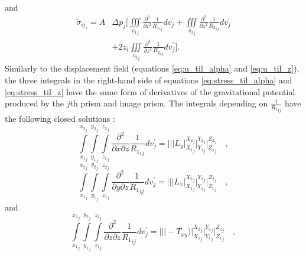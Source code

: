 \documentclass[P]{BrJG_submit}
\begin{document}
and 
\begin{equation}
\begin{aligned}
{\tilde{\sigma}}_{{ij}_{z}} \! = \! A  
& \Delta p_{j} \!  \Bigg[
\iiint\limits_{{v_{1}}_{j}} \! \! 
\frac{\partial^{2}}{\partial z^{2}} {\frac{1}{{R_1}_{ij}}}  dv_{j}^{\prime}
\! + \!\iiint\limits_{{v_{2}}_{j}}
\frac{\partial^{2} }{\partial z^{2}} {\frac{1}{{R_2}_{ij}}} dv_{j}^{\prime} \\
& + 2 z_{i}  \iiint\limits_{{v_{2}}_{j}}
\frac{\partial^{3}  }{\partial z^{3}} {\frac{1}{{R_2}_{ij}}}  
dv_{j}^{\prime} \Bigg].
\end{aligned}
\label{eq:stress_til_z}
\end{equation}
Similarly to the displacement field (equations \ref{eq:u_til_alpha} and \ref{eq:u_til_z}), the three integrals in the right-hand side of equations \ref{eq:stress_til_alpha} and \ref{eq:stress_til_z} have the same form of 
derivatives of the gravitational potential produced by the $j$th prism and image prism.
The integrals depending on $\frac{1}{{R_1}_{ij}}$ have the following closed 
solutions \citep{Nagyetal2000, Nagyetal2002}:
\begin{equation}
\int\limits_{{x_{1}}_{j}}^{{x_{2}}_{j}} \int\limits_{{y_{1}}_{j}}^{{y_{2}}_{j}} \int\limits_{{z_{1}}_{j}}^{{z_{2}}_{j}} 
\! \! \!
\frac{\partial^{2}  }{\partial x \partial z}{\frac{1}{{R_1}_{ij}}} dv_{j}^{\prime} = 
\Bigg|\Bigg|\Bigg| L_y 
\Bigg|_{{X_1}_{j}}^{{X_2}_{j}} \Bigg|_{{Y_1}_{j}}^{{Y_2}_{j}} \Bigg|_{{Z_1}_{j}}^{{Z_2}_{j}} \quad ,
\label{dxz1}
\end{equation}
\begin{equation}
\int\limits_{{x_{1}}_{j}}^{{x_{2}}_{j}} \int\limits_{{y_{1}}_{j}}^{{y_{2}}_{j}} \int\limits_{{z_{1}}_{j}}^{{z_{2}}_{j}}
\! \! \!
\frac{\partial^{2}  }{\partial y \partial z} {\frac{1}{{R_1}_{ij}}} dv_{j}^{\prime} =
\Bigg|\Bigg|\Bigg|
L_x
\Bigg|_{{X_1}_{j}}^{{X_2}_{j}} \Bigg|_{{Y_1}_{j}}^{{Y_2}_{j}} \Bigg|_{{Z_1}_{j}}^{{Z_2}_{j}} \quad ,
\label{dyz1}
\end{equation}
and
\begin{equation}
\int\limits_{{x_{1}}_{j}}^{{x_{2}}_{j}} \int\limits_{{y_{1}}_{j}}^{{y_{2}}_{j}} \int\limits_{{z_{1}}_{j}}^{{z_{2}}_{j}}
\! \! \!
\frac{\partial^{2}  }{\partial z \partial z} {\frac{1}{{R_1}_{ij}}} dv_{j}^{\prime} =
\Bigg|\Bigg|\Bigg|
-  T_{xy} \Bigg)
\Bigg|_{{X_1}_{j}}^{{X_2}_{j}} \Bigg|_{{Y_1}_{j}}^{{Y_2}_{j}} \Bigg|_{{Z_1}_{j}}^{{Z_2}_{j}} \quad ,
\label{dzz1}
\end{equation}
\end{document}
